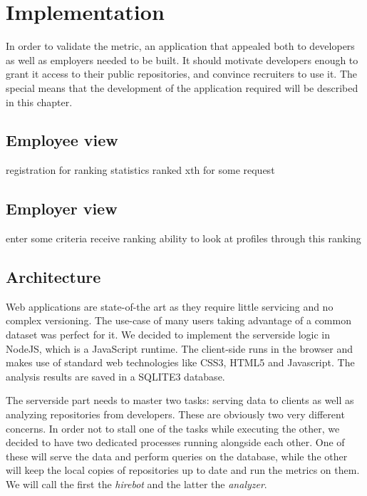 \chapter{Implementation}\label{ch:implementation}
In order to validate the metric,
an application that appealed both to developers as well as employers
needed to be built. It should motivate developers enough to grant it access to their
public repositories, and convince recruiters to use it. The special means that
the development of the application required will be described in this chapter.

\section{Employee view}
registration for ranking
statistics
ranked xth for some request

\section{Employer view}
enter some criteria
receive ranking
ability to look at profiles through this ranking

\section{Architecture}
Web applications are state-of-the art as they require little servicing
and no complex versioning. The use-case of many users taking
advantage of a common dataset was perfect for it.
We decided to implement the serverside logic in NodeJS, which is a
JavaScript runtime. The client-side runs in the browser and makes
use of standard web technologies like CSS3, HTML5 and Javascript.
The analysis results are saved in a SQLITE3 database.
\newline

The serverside part needs to master two tasks: serving data to clients
as well as analyzing repositories from developers.
These are obviously two very different concerns.
In order not to stall one of the tasks while executing the other,
we decided to have two dedicated processes running alongside each other.
One of these will serve the data and perform queries on the database,
while the other will keep the local copies of repositories up to date and run
the metrics on them. We will call the first the \textit{hirebot} and the
latter the \textit{analyzer}.


